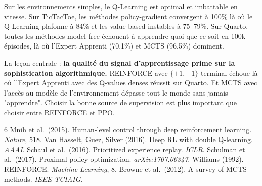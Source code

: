 \documentclass[12pt,a4paper]{article}
\begin{document}
Sur les environnements simples, le Q-Learning est optimal et imbattable en vitesse. Sur TicTacToe, les méthodes policy-gradient convergent à 100\% là où le Q-Learning plafonne à 84\% et les value-based instables à 75--79\%. Sur Quarto, toutes les méthodes model-free échouent à apprendre quoi que ce soit en 100k épisodes, là où l'Expert Apprenti (70.1\%) et MCTS (96.5\%) dominent.

La leçon centrale : \textbf{la qualité du signal d'apprentissage prime sur la sophistication algorithmique.} REINFORCE avec $\{+1,-1\}$ terminal échoue là où l'Expert Apprenti avec des Q-values denses réussit sur Quarto. Et MCTS avec l'accès au modèle de l'environnement dépasse tout le monde sans jamais "apprendre". Choisir la bonne source de supervision est plus important que choisir entre REINFORCE et PPO.

\bigskip
\begin{thebibliography}{6}
 Mnih et al.\ (2015). Human-level control through deep reinforcement learning. \textit{Nature}, 518.
 Van Hasselt, Guez, Silver (2016). Deep RL with double Q-learning. \textit{AAAI}.
 Schaul et al.\ (2016). Prioritized experience replay. \textit{ICLR}.
 Schulman et al.\ (2017). Proximal policy optimization. \textit{arXiv:1707.06347}.
 Williams (1992). REINFORCE. \textit{Machine Learning}, 8.
 Browne et al.\ (2012). A survey of MCTS methods. \textit{IEEE TCIAIG}.
\end{thebibliography}
\end{document}

